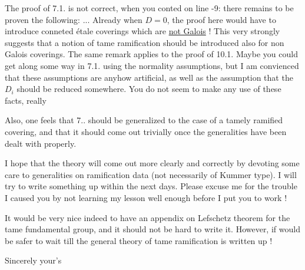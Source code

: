 The proof of 7.1. is not correct, when you conted on line -9: there remains to be proven the following: ... Already when $D=0$, the proof here would have to introduce conneted étale coverings which are \uline{not Galois} ! This very strongly suggests that a notion of tame ramification should be introduced also  for non Galois coverings. The same remark applies to the proof of 10.1. Maybe you could get along some way in 7.1. using the normality assumptions, but I am convienced that these assumptions are anyhow artificial, as well as the assumption that the $D_i$ should be reduced somewhere. You do not seem to make any use of these facts, really

Also, one feels that 7.. should be generalized to the case of a tamely ramified covering, and that it should come out trivially once the generalities have been dealt with properly.

I hope that the theory will come out more clearly and correctly by devoting some care to generalities on ramification data (not necessarily of Kummer type). I will try to write something up within the next days. Please excuse me for the trouble I caused you by not learning my lesson well enough before I put you to work !

It would be very nice indeed to have an appendix on Lefschetz theorem for the tame fundamental group, and it should not be hard to write it. However, if would be safer to wait till the general theory of tame ramification is written up !

Sincerely your's\\
